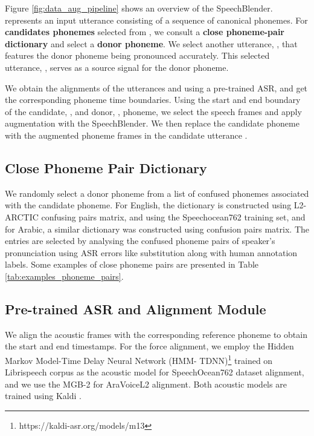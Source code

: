 \documentclass{INTERSPEECH2023}
\begin{document}
 
Figure \ref{fig:data_aug_pipeline} shows an overview of the SpeechBlender.  represents an input utterance consisting of a sequence of canonical phonemes. For \textbf{candidates phonemes} selected from ,
we consult a \textbf{close phoneme-pair dictionary} and select a \textbf{donor phoneme}. We select another utterance, , that features the donor phoneme being pronounced accurately. This selected utterance, , serves as a source signal for the donor phoneme.

We obtain the alignments of the utterances  and  using a pre-trained ASR, and get the corresponding phoneme time boundaries. Using the start and end boundary of the candidate, ,  and donor, , phoneme, we select the speech frames and apply augmentation with the SpeechBlender. We then replace the candidate phoneme  with the augmented phoneme frames  in the candidate utterance .


\subsection{Close Phoneme Pair Dictionary}
We randomly select a donor phoneme from a list of confused phonemes associated with the candidate phoneme. For English, the dictionary is constructed using L2-ARCTIC \cite{l2_arctic} confusing pairs matrix, and using the Speechocean762 \cite{speechocean} training set, and for Arabic, a similar dictionary was constructed using \cite{algabri2022mispronunciation} confusion pairs matrix. The entries are selected by analysing the confused phoneme pairs of speaker's pronunciation using ASR errors like substitution along with human annotation labels. Some examples of close phoneme pairs are presented in Table \ref{tab:examples_phoneme_pairs}.



\begin{table}[!ht]
\centering
{}
\caption{Examples of entries in Close Phoneme Pair Dictionary, with their \% of confusion.}
\label{tab:examples_phoneme_pairs}
\vspace{-0.6cm}
\end{table}


\subsection{Pre-trained ASR and Alignment Module}
\label{ssec:asr}
We align the acoustic frames with the corresponding reference phoneme to obtain the start and end timestamps. For the force alignment, 
we employ the Hidden Markov Model-Time Delay Neural Network (HMM- TDNN)\footnote{https://kaldi-asr.org/models/m13} trained on Librispeech corpus as the acoustic model for SpeechOcean762 dataset alignment, and we use the MGB-2 \cite{ali2016mgb} for AraVoiceL2 alignment. Both acoustic models are trained using Kaldi \cite{kaldi}. 
\end{document}
